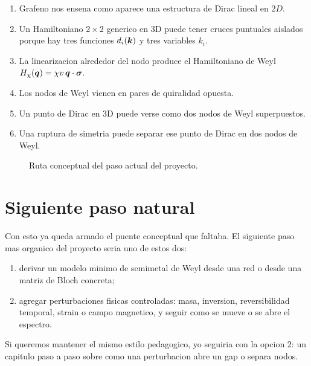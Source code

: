 \begin{enumerate}[leftmargin=*]
  \item Grafeno nos ensena como aparece una estructura de Dirac lineal en \(2D\).
  \item Un Hamiltoniano \(2\times 2\) generico en 3D puede tener cruces puntuales aislados porque hay tres funciones \(d_i(\bm{k})\) y tres variables \(k_i\).
  \item La linearizacion alrededor del nodo produce el Hamiltoniano de Weyl
  \(
  H_\chi(\bm{q})=\chi v\, \bm{q}\cdot\bm{\sigma}.
  \)
  \item Los nodos de Weyl vienen en pares de quiralidad opuesta.
  \item Un punto de Dirac en 3D puede verse como dos nodos de Weyl superpuestos.
  \item Una ruptura de simetria puede separar ese punto de Dirac en dos nodos de Weyl.
\end{enumerate}

\begin{figure}[ht]
\centering
{}
\caption{Ruta conceptual del paso actual del proyecto.}
\label{c06:fig:roadmap}
\end{figure}

\section{Siguiente paso natural}

Con esto ya queda armado el puente conceptual que faltaba. El siguiente paso mas organico del proyecto seria uno de estos dos:

\begin{enumerate}[leftmargin=*]
  \item derivar un modelo minimo de semimetal de Weyl desde una red o desde una matriz de Bloch concreta;
  \item agregar perturbaciones fisicas controladas: masa, inversion, reversibilidad temporal, strain o campo magnetico, y seguir como se mueve o se abre el espectro.
\end{enumerate}

Si queremos mantener el mismo estilo pedagogico, yo seguiria con la opcion 2: un capitulo paso a paso sobre como una perturbacion abre un gap o separa nodos.
